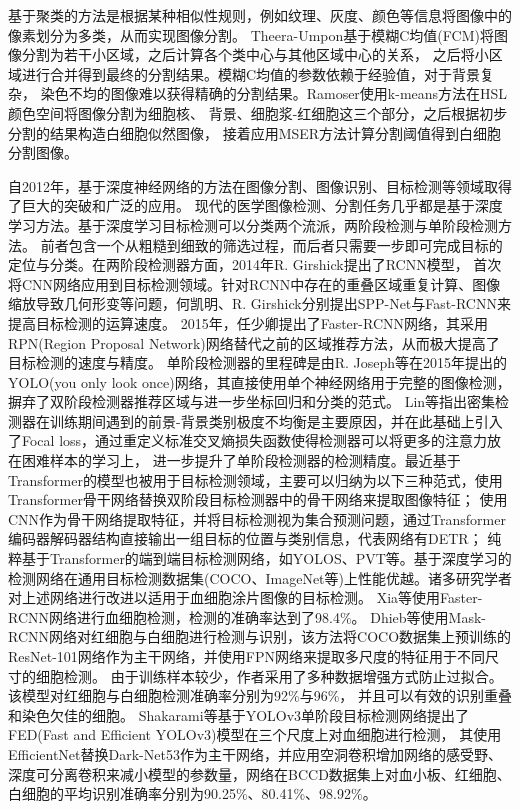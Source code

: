 基于聚类的方法是根据某种相似性规则，例如纹理、灰度、颜色等信息将图像中的像素划分为多类，从而实现图像分割。
Theera-Umpon\cite{theera2005white}基于模糊C均值(FCM)将图像分割为若干小区域，之后计算各个类中心与其他区域中心的关系，
之后将小区域进行合并得到最终的分割结果。模糊C均值的参数依赖于经验值，对于背景复杂，
染色不均的图像难以获得精确的分割结果。Ramoser\cite{ramoser2006leukocyte}使用k-means方法在HSL颜色空间将图像分割为细胞核、
背景、细胞浆-红细胞这三个部分，之后根据初步分割的结果构造白细胞似然图像，
接着应用MSER方法计算分割阈值得到白细胞分割图像。

自2012年，基于深度神经网络的方法在图像分割、图像识别、目标检测等领域取得了巨大的突破和广泛的应用。
现代的医学图像检测、分割任务几乎都是基于深度学习方法。基于深度学习目标检测可以分类两个流派，两阶段检测与单阶段检测方法。
前者包含一个从粗糙到细致的筛选过程，而后者只需要一步即可完成目标的定位与分类。在两阶段检测器方面，2014年R. Girshick\cite{girshick2014rich}提出了RCNN模型，
首次将CNN网络应用到目标检测领域。针对RCNN中存在的重叠区域重复计算、图像缩放导致几何形变等问题，何凯明\cite{he2015spatial}、R. Girshick\cite{girshick2015fast}分别提出SPP-Net与Fast-RCNN来提高目标检测的运算速度。
2015年，任少卿\cite{ren2015faster}提出了Faster-RCNN网络，其采用RPN(Region Proposal Network)网络替代之前的区域推荐方法，从而极大提高了目标检测的速度与精度。
单阶段检测器的里程碑是由R. Joseph\cite{redmon2016you}等在2015年提出的YOLO(you only look once)网络，其直接使用单个神经网络用于完整的图像检测，摒弃了双阶段检测器推荐区域与进一步坐标回归和分类的范式。
Lin等\cite{lin2017focal}指出密集检测器在训练期间遇到的前景-背景类别极度不均衡是主要原因，并在此基础上引入了Focal loss，通过重定义标准交叉熵损失函数使得检测器可以将更多的注意力放在困难样本的学习上，
进一步提升了单阶段检测器的检测精度。最近基于Transformer\cite{vaswani2017attention}的模型也被用于目标检测领域，主要可以归纳为以下三种范式，使用Transformer骨干网络替换双阶段目标检测器中的骨干网络来提取图像特征；
使用CNN作为骨干网络提取特征，并将目标检测视为集合预测问题，通过Transformer编码器解码器结构直接输出一组目标的位置与类别信息，代表网络有DETR\cite{zhu2020deformable}；
纯粹基于Transformer的端到端目标检测网络，如YOLOS\cite{fang2021you}、PVT\cite{wang2021pyramid}等。基于深度学习的检测网络在通用目标检测数据集(COCO、ImageNet等)上性能优越。诸多研究学者对上述网络进行改进以适用于血细胞涂片图像的目标检测。
Xia\cite{xia2019automated}等使用Faster-RCNN网络进行血细胞检测，检测的准确率达到了98.4\%。
Dhieb\cite{dhieb2019automated}等使用Mask-RCNN网络对红细胞与白细胞进行检测与识别，该方法将COCO数据集上预训练的ResNet-101网络作为主干网络，并使用FPN网络来提取多尺度的特征用于不同尺寸的细胞检测。
由于训练样本较少，作者采用了多种数据增强方式防止过拟合。该模型对红细胞与白细胞检测准确率分别为92\%与96\%，
并且可以有效的识别重叠和染色欠佳的细胞。
Shakarami\cite{shakarami2021fast}等基于YOLOv3单阶段目标检测网络提出了FED(Fast and Efficient YOLOv3)模型在三个尺度上对血细胞进行检测，
其使用EfficientNet替换Dark-Net53作为主干网络，并应用空洞卷积增加网络的感受野、深度可分离卷积来减小模型的参数量，网络在BCCD数据集上对血小板、红细胞、
白细胞的平均识别准确率分别为90.25\%、80.41\%、98.92\%\cite{SWGC202206005}。

